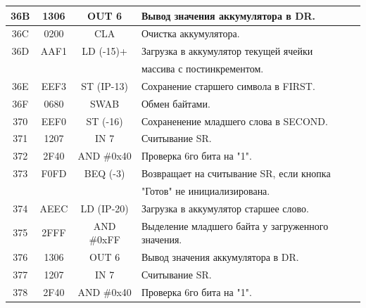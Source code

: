 \begin{center}
\begin{tabular}{|c|c|c|l|}
        36B                   & 1306                  & OUT 6              & Вывод значения аккумулятора в DR.                   \\
        \hline
        36C                   & 0200                  & CLA                & Очистка аккумулятора.                               \\
        36D                   & AAF1                  & LD (-15)+          & Загрузка в аккумулятор текущей ячейки               \\
        &                       &                    & массива с постинкрементом.                          \\
        36E                   & EEF3                  & ST (IP-13)         & Сохранение старшего символа в FIRST.                \\
        36F                   & 0680                  & SWAB               & Обмен байтами.                                      \\
        370                   & EEF0                  & ST (-16)           & Сохраненение младшего слова в SECOND.               \\
        \hline
        371                   & 1207                  & IN 7               & Считывание SR.                                      \\
        372                   & 2F40                  & AND \#0x40         & Проверка 6го бита на "1".                           \\
        373                   & F0FD                  & BEQ (-3)           & Возвращает на считывание SR, если кнопка            \\
        &                       &                    & "Готов" не инициализирована.                        \\
        374                   & AEEC                  & LD (IP-20)         & Загрузка в аккумулятор старшее слово.               \\
        375                   & 2FFF                  & AND \#0xFF         & Выделение младшего байта у загруженного значения.   \\
        376                   & 1306                  & OUT 6              & Вывод значения аккумулятора в DR.                   \\
        \hline
        377                   & 1207                  & IN 7               & Считывание SR.                                      \\
        378                   & 2F40                  & AND \#0x40         & Проверка 6го бита на "1".                           \\

\end{tabular}
\end{center}
